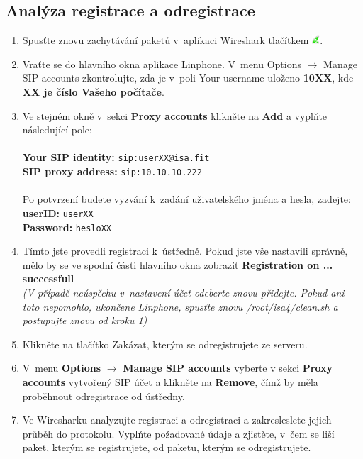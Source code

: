 \subsection{Analýza registrace a odregistrace}
\begin{enumerate}
    \item Spusťte znovu zachytávání paketů v aplikaci Wireshark tlačítkem \includegraphics[width=3mm]{img/ws_start.png}.
    \item Vraťte se do hlavního okna aplikace Linphone. V menu Options $\rightarrow$ Manage SIP accounts zkontrolujte, zda je v poli Your username uloženo {\bf 10XX}, kde {\bf XX je číslo Vašeho počítače}.
    \item Ve stejném okně v sekci {\bf Proxy accounts} klikněte na {\bf Add} a vyplňte následující pole: \\
    ~\\
    {\bf Your SIP identity:} 	{\tt sip:userXX@isa.fit} \\
    {\bf SIP proxy address:}	{\tt sip:10.10.10.222} \\
    ~\\
	Po potvrzení budete vyzvání k zadání uživatelského jména a hesla, zadejte: \\
    {\bf userID:} 	{\tt userXX} \\
    {\bf Password:}	{\tt hesloXX}
    \item Tímto jste provedli registraci k ústředně. Pokud jste vše nastavili správně, mělo by se ve spodní části hlavního okna zobrazit {\bf Registration on ... successfull} \\
    {\it (V případě neúspěchu v nastavení účet odeberte znovu přidejte. Pokud ani toto nepomohlo, ukončene Linphone, spusťte znovu /root/isa4/clean.sh a postupujte znovu od kroku 1)}
    \item Klikněte na tlačítko Zakázat, kterým se odregistrujete ze serveru.
    \item V menu {\bf Options} $\rightarrow$ {\bf Manage SIP accounts} vyberte v sekci {\bf Proxy accounts} vytvořený SIP účet a klikněte na {\bf Remove}, čímž by měla proběhnout odregistrace od ústředny.
    \item Ve Wiresharku analyzujte registraci a odregistraci a zakresleslete jejich průběh do protokolu. Vyplňte požadované údaje a zjistěte, v čem se liší paket, kterým se registrujete, od paketu, kterým se odregistrujete.
\end{enumerate}


